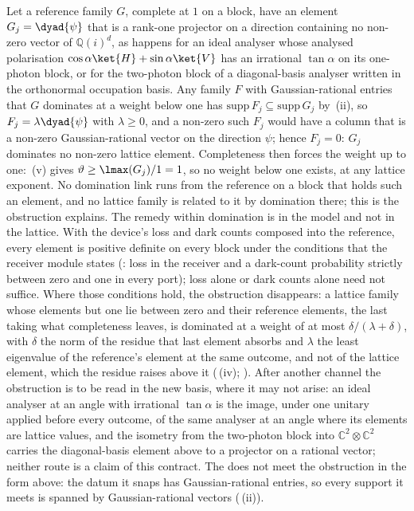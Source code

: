 \begin{remark}\label{rem:rotated-projective}
Let a reference family $G$, complete at $1$ on a block, have an element
$G_j=\dyad{\psi}$ that is a rank-one projector on a direction containing no
non-zero vector of $\mathbb{Q}(i)^{d}$, as happens for an ideal analyser
whose analysed polarisation $\cos\alpha\ket{H}+\sin\alpha\ket{V}$ has an
irrational $\tan\alpha$ on its one-photon block, or for the
two-photon block of a diagonal-basis analyser written in the orthonormal
occupation basis. Any family $F$ with Gaussian-rational entries that $G$
dominates at a weight below one has
$\mathrm{supp}\,F_j\subseteq\mathrm{supp}\,G_j$ by
\,(ii), so $F_j=\lambda\dyad{\psi}$ with
$\lambda\ge0$, and a non-zero such $F_j$ would have a column that is a
non-zero Gaussian-rational vector on the direction $\psi$; hence $F_j=0$:
$G_j$ dominates no non-zero lattice element. Completeness then forces the
weight up to one: \,(v) gives
$\vartheta\ge\lmax(G_j)/1=1$, so no weight below one exists, at any lattice
exponent. No domination link runs from the reference on a block that holds
such an element, and no lattice family is related to it by domination there;
this is the obstruction  explains. The
remedy within domination is in the model and not in the lattice. With the
device's loss and dark counts composed into the reference, every element is
positive definite on every block under the conditions that the receiver
module states (:
loss in the receiver and a dark-count probability strictly between zero and
one in every port); loss alone or dark counts alone need not suffice. Where
those conditions hold, the obstruction disappears: a lattice family whose
elements but one lie between zero and their reference elements, the last
taking what completeness leaves, is dominated at a weight of at most
$\delta/(\lambda+\delta)$, with $\delta$ the norm of the residue that last
element absorbs and $\lambda$ the least eigenvalue of the reference's element
at the same outcome, and not of the lattice element, which
the residue raises above it
(\,(iv);
).
After another channel the obstruction is to be read in the new basis, where
it may not arise: an ideal analyser at an angle with irrational
$\tan\alpha$ is the
image, under one unitary applied before every outcome, of the same analyser
at an angle where its elements are lattice values, and the isometry from the
two-photon block into $\mathbb{C}^{2}\otimes\mathbb{C}^{2}$ carries the
diagonal-basis element above to a projector on a rational vector; neither
route is a claim of this contract. The  does not meet the
obstruction in the form above: the datum it snaps has Gaussian-rational
entries, so every support it meets is spanned by Gaussian-rational vectors
(\,(ii)).
\end{remark}
